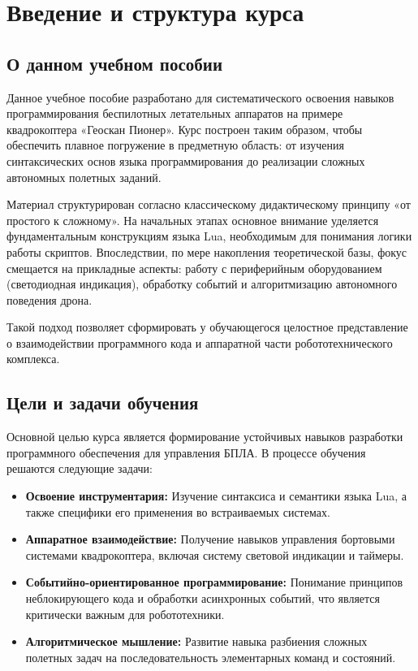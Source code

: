\section{Введение и структура курса}

\subsection*{О данном учебном пособии}

Данное учебное пособие разработано для систематического освоения навыков программирования беспилотных летательных аппаратов на примере квадрокоптера «Геоскан Пионер». Курс построен таким образом, чтобы обеспечить плавное погружение в предметную область: от изучения синтаксических основ языка программирования до реализации сложных автономных полетных заданий.

Материал структурирован согласно классическому дидактическому принципу «от простого к сложному». На начальных этапах основное внимание уделяется фундаментальным конструкциям языка Lua, необходимым для понимания логики работы скриптов. Впоследствии, по мере накопления теоретической базы, фокус смещается на прикладные аспекты: работу с периферийным оборудованием (светодиодная индикация), обработку событий и алгоритмизацию автономного поведения дрона.

Такой подход позволяет сформировать у обучающегося целостное представление о взаимодействии программного кода и аппаратной части робототехнического комплекса.

\subsection*{Цели и задачи обучения}

Основной целью курса является формирование устойчивых навыков разработки программного обеспечения для управления БПЛА. В процессе обучения решаются следующие задачи:

\begin{itemize}
    \item \textbf{Освоение инструментария:} Изучение синтаксиса и семантики языка Lua, а также специфики его применения во встраиваемых системах.
    \item \textbf{Аппаратное взаимодействие:} Получение навыков управления бортовыми системами квадрокоптера, включая систему световой индикации и таймеры.
    \item \textbf{Событийно-ориентированное программирование:} Понимание принципов неблокирующего кода и обработки асинхронных событий, что является критически важным для робототехники.
    \item \textbf{Алгоритмическое мышление:} Развитие навыка разбиения сложных полетных задач на последовательность элементарных команд и состояний.
\end{itemize}

